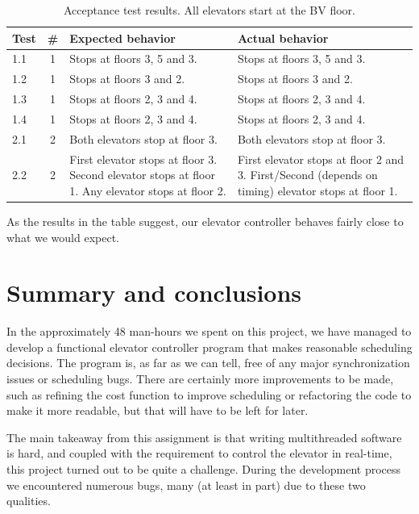 \documentclass[a4paper]{article}
\begin{document}
\begin{table}[h]
    \begin{tabular}{| l | c | p{4.7cm} | p{4.7cm} |}
        \hline
        Test & \# & Expected behavior & Actual behavior \\
        \hline
        1.1 & 1 &
            Stops at floors 3, 5 and 3. &
            Stops at floors 3, 5 and 3. \\
        1.2 & 1 &
            Stops at floors 3 and 2. &
            Stops at floors 3 and 2. \\
        1.3 & 1 &
            Stops at floors 2, 3 and 4. &
            Stops at floors 2, 3 and 4. \\
        1.4 & 1 &
            Stops at floors 2, 3 and 4. &
            Stops at floors 2, 3 and 4. \\
        2.1 & 2 &
            Both elevators stop at floor 3. &
            Both elevators stop at floor 3. \\
        2.2 & 2 &
            First elevator stops at floor 3.
                Second elevator stops at floor 1.
                Any elevator stops at floor 2. &
            First elevator stops at floor 2 and 3.
            First/Second (depends on timing) elevator stops at floor 1. \\
        \hline
    \end{tabular}
    \caption{Acceptance test results. All elevators start at the BV floor.}
    \label{tab:acceptance_test_results}
\end{table}

As the results in the table suggest, our elevator controller behaves fairly
close to what we would expect.

\section{Summary and conclusions}

In the approximately 48 man-hours we spent on this project, we have managed to
develop a functional elevator controller program that makes reasonable
scheduling decisions. The program is, as far as we can tell, free of any major
synchronization issues or scheduling bugs. There are certainly more improvements
to be made, such as refining the cost function to improve scheduling or
refactoring the code to make it more readable, but that will have to be left for
later.

The main takeaway from this assignment is that writing multithreaded software is
hard, and coupled with the requirement to control the elevator in real-time,
this project turned out to be quite a challenge. During the development process
we encountered numerous bugs, many (at least in part) due to these two
qualities.
\end{document}
